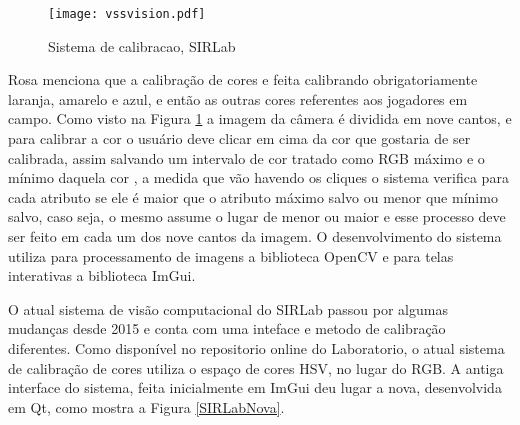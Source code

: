 \begin{figure}[H]
	\centering
	\texttt{[image: vssvision.pdf]} 	
	\caption{Sistema de calibracao, SIRLab\cite{Rosa:2015}}
	\label{SIRLabCalibracao}
\end{figure}
Rosa menciona que a calibração de cores e feita calibrando obrigatoriamente laranja, amarelo e azul, e então as outras cores referentes aos jogadores em campo. Como visto na Figura \ref{SIRLabCalibracao} a imagem da c\^amera é dividida em nove cantos, e para calibrar a cor o usuário deve clicar em cima da cor que gostaria de ser calibrada, assim salvando um intervalo de cor tratado como RGB máximo e o mínimo daquela cor , a medida
que vão havendo os cliques o sistema verifica para cada atributo se ele é maior que o atributo
máximo salvo ou menor que mínimo salvo, caso seja, o mesmo assume o lugar de menor ou
maior e esse processo deve ser feito em cada um dos nove cantos da imagem\cite{Rosa:2015}. 
O desenvolvimento do sistema utiliza para processamento de imagens a biblioteca OpenCV e para telas interativas a biblioteca  ImGui.


O atual sistema de visão computacional do SIRLab passou por algumas mudanças desde 2015 e conta com uma inteface e metodo de calibração diferentes\cite{VSSVision}. Como disponível no repositorio online do Laboratorio, o atual sistema de calibração de cores utiliza o espaço de cores HSV, no lugar do RGB\cite{Rosa:2015}. A antiga interface do sistema, feita inicialmente em ImGui deu lugar a nova, desenvolvida em Qt, como mostra a Figura \ref{SIRLabNova}.

